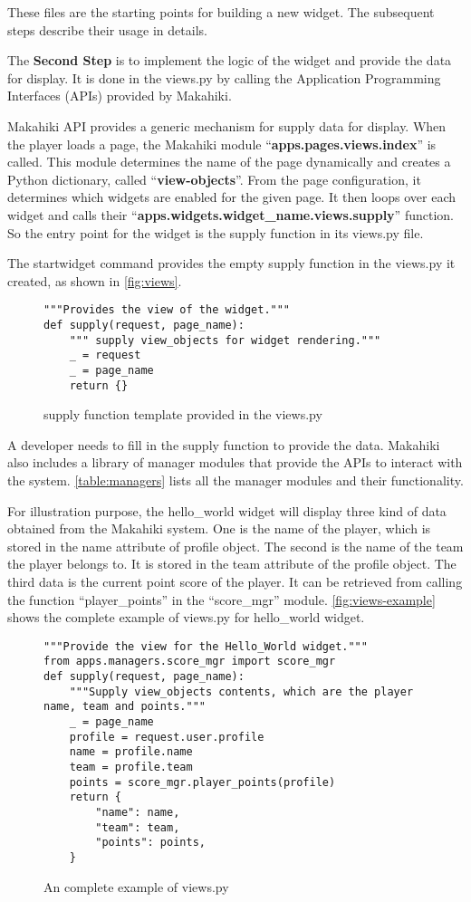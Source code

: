 These files are the starting points for building a new widget. The subsequent steps describe their usage in details.

The {\bf Second Step} is to implement the logic of the widget and provide the data for display. It is done in the views.py by calling the Application Programming Interfaces (APIs) provided by Makahiki. 

Makahiki API provides a generic mechanism for supply data for display.  When the player loads a page, the Makahiki module ``{\bf apps.pages.views.index}'' is called. This module determines the name of the page dynamically and creates a Python dictionary, called ``{\bf view-objects}''.  From the page configuration, it determines which widgets are enabled for the given page. It then loops over each widget and calls their ``{\bf apps.widgets.widget\_name.views.supply}'' function. So the entry point for the widget is the supply function in its views.py file. 

The startwidget command provides the empty supply function in the views.py it created, as shown in \autoref{fig:views}. 
\begin{figure}[!ht]
\begin{lstlisting}
"""Provides the view of the widget."""
def supply(request, page_name):
    """ supply view_objects for widget rendering."""
    _ = request
    _ = page_name
    return {}
\end{lstlisting}
\caption{supply function template provided in the views.py}
\label{fig:views}
\end{figure}

A developer needs to fill in the supply function to provide the data. Makahiki also includes a library of manager modules that provide the APIs to interact with the system. \autoref{table:managers} lists all the manager modules and their functionality. 

For illustration purpose, the hello\_world widget will display three kind of data obtained from the Makahiki system. One is the name of the player, which is stored in the name attribute of profile object. The second is the name of the team the player belongs to. It is stored in the team attribute of the profile object. The third data is the current point score of the player. It can be retrieved from calling the function ``player\_points'' in the ``score\_mgr'' module. \autoref{fig:views-example} shows the complete example of views.py for hello\_world widget.

\begin{figure}[!ht]
\begin{lstlisting}
"""Provide the view for the Hello_World widget."""
from apps.managers.score_mgr import score_mgr
def supply(request, page_name):
    """Supply view_objects contents, which are the player name, team and points."""
    _ = page_name
    profile = request.user.profile
    name = profile.name
    team = profile.team
    points = score_mgr.player_points(profile)
    return {
        "name": name,
        "team": team,
        "points": points,
    }
\end{lstlisting}
\caption{An complete example of views.py}
\label{fig:views-example}
\end{figure}

